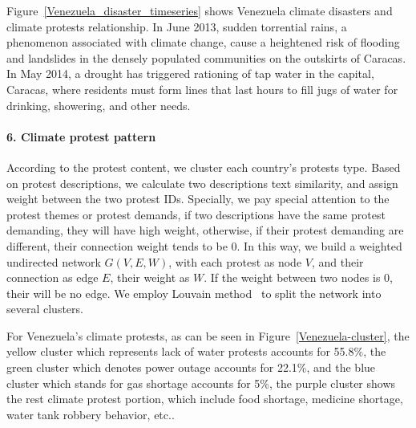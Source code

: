 \documentclass[9pt,twocolumn,twoside]{pnas-new}
\begin{document}
Figure~\ref{Venezuela_disaster_timeseries} shows Venezuela climate disasters and climate protests relationship. In June 2013, sudden torrential rains, a phenomenon associated with climate change, cause a heightened risk of flooding and landslides in the densely populated communities on the outskirts of Caracas. In May 2014, a drought has triggered rationing of tap water in the capital, Caracas, where residents must form lines that last hours to fill jugs of water for drinking, showering, and other needs.


\paragraph{6. Climate protest pattern}
According to the protest content, we cluster each country's protests type. Based on protest descriptions, we calculate two descriptions text similarity, and assign weight between the two protest IDs. Specially, we pay special attention to the protest themes or protest demands, if two descriptions have the same protest demanding, they will have high weight, otherwise, if their protest demanding are different, their connection weight tends to be 0. In this way, we build a weighted undirected network $G(V, E, W)$, with each protest as node $V$, and their connection as edge $E$, their weight as $W$. If the weight between two nodes is 0, their will be no edge. We employ Louvain method~\cite{blondel2008fast} to split the network into several clusters.



For Venezuela's climate protests, as can be seen in Figure~\ref{Venezuela-cluster}, the yellow cluster which represents lack of water protests accounts for 55.8\%, the green cluster which denotes power outage accounts for 22.1\%, and the blue cluster which stands for gas shortage accounts for 5\%, the purple cluster shows the rest climate protest portion, which include food shortage, medicine shortage, water tank robbery behavior, etc..
\end{document}
